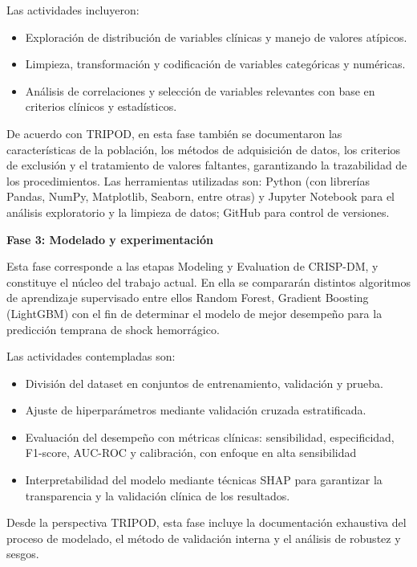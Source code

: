 \documentclass[12pt, letterpaper]{article}
\begin{document}
Las actividades incluyeron:

\begin{itemize}
    \item Exploración de distribución de variables clínicas y manejo de valores atípicos.
    \item Limpieza, transformación y codificación de variables categóricas y numéricas.
    \item Análisis de correlaciones y selección de variables relevantes con base en criterios clínicos y estadísticos.
\end{itemize}

De acuerdo con TRIPOD, en esta fase también se documentaron las características de la población, los métodos de adquisición de datos, los criterios de exclusión y el tratamiento de valores faltantes, garantizando la trazabilidad de los procedimientos. Las herramientas utilizadas son: Python (con librerías Pandas, NumPy, Matplotlib, Seaborn, entre otras) y Jupyter Notebook para el análisis exploratorio y la limpieza de datos; GitHub para control de versiones.

\textbf{Fase 3: Modelado y experimentación}

Esta fase corresponde a las etapas Modeling y Evaluation de CRISP-DM, y constituye el núcleo del trabajo actual. En ella se compararán distintos algoritmos de aprendizaje supervisado entre ellos Random Forest, Gradient Boosting (LightGBM) con el fin de determinar el modelo de mejor desempeño para la predicción temprana de shock hemorrágico.

Las actividades contempladas son:

\begin{itemize}
    \item División del dataset en conjuntos de entrenamiento, validación y prueba.
    \item Ajuste de hiperparámetros mediante validación cruzada estratificada.
    \item Evaluación del desempeño con métricas clínicas: sensibilidad, especificidad, F1-score, AUC-ROC y calibración, con enfoque en alta sensibilidad
    \item Interpretabilidad del modelo mediante técnicas SHAP para garantizar la transparencia y la validación clínica de los resultados.
\end{itemize}

Desde la perspectiva TRIPOD, esta fase incluye la documentación exhaustiva del proceso de modelado, el método de validación interna y el análisis de robustez y sesgos.
\end{document}
